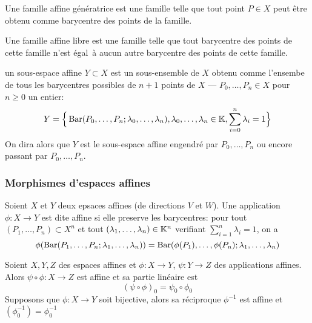 \begin{definition}
	Une famille affine génératrice est une famille telle que tout point $P \in X$
	peut être obtenu comme barycentre des points de la famille.
\end{definition}

\begin{definition}
	Une famille affine libre est une famille telle que tout barycentre des points
	de cette famille n'est égal à aucun autre barycentre des points de cette
	famille.
\end{definition}

\begin{definition}
	un sous-espace affine $Y \subset X$ est un sous-ensemble de $X$ obtenu comme
	l'ensembe de tous les barycentres possibles de $n+1$ points de $X$ --- 
	$P_0, \dots, P_n \in X$ pour $n \geq 0$ un entier:
	\begin{equation*}
		Y = \Big\{\operatorname{Bar}(P_0, \dots, P_n; \lambda_0, \dots, \lambda_n), 
		\lambda_0, \dots, \lambda_n \in \mathbb{K}, \sum_{i=0}^n \lambda_i = 1\Big\}
	\end{equation*}
	On dira alors que $Y$ est le sous-espace affine engendré par $P_0, \dots, P_n$
	ou encore passant par $P_0, \dots, P_n$.
\end{definition}

\subsubsection{Morphismes d'espaces affines}

\begin{definition}
	Soient $X$ et $Y$ deux epsaces affines (de directions $V$ et $W$). Une
	application $\phi: X \to Y$ est dite affine si elle preserve les barycentres:
	pour tout $(P_1, \dots, P_n) \subset X^n$ et tout
	$(\lambda_1, \dots, \lambda_n) \in \mathbb{K}^n$ verifiant
	$\sum_{i=1}^n \lambda_i = 1$, on a
	\begin{equation*}
		\phi(\operatorname{Bar}(P_1, \dots, P_n; \lambda_1, \dots, \lambda_n)) = 
		\operatorname{Bar}(\phi(P_1), \dots, \phi(P_n); \lambda_1, \dots, \lambda_n)
	\end{equation*}
\end{definition}

\begin{proposition}
	Soient $X, Y, Z$ des espaces affines et $\phi: X \to Y$, 
	$\psi: Y \to Z$ des applications affines. Alors
	$\psi \circ \phi : X \to Z$ est affine et sa partie linéaire est
	\begin{equation*}
		(\psi \circ \phi)_0 = \psi_0 \circ \phi_0
	\end{equation*}
	Supposons que $\phi: X \to Y$ soit bijective, alors sa réciproque $\phi^{-1}$
	est affine et $(\phi^{-1}_0) = \phi_0^{-1}$
\end{proposition}

